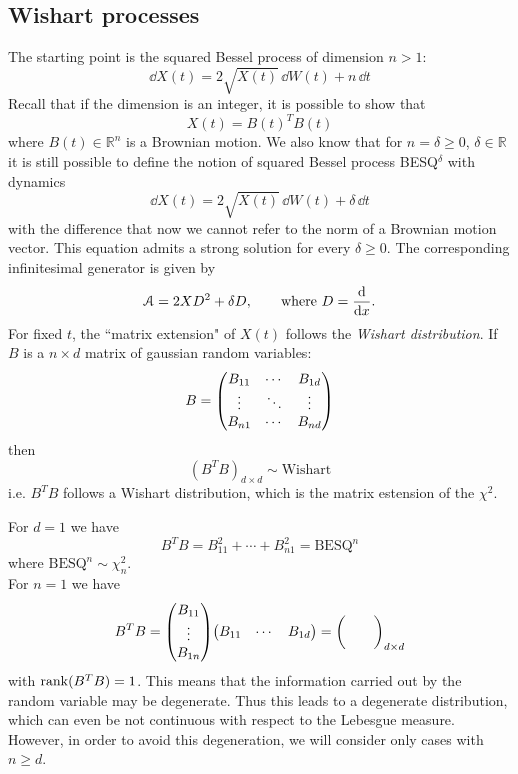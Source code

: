 \subsection{Wishart processes}
The starting point is the squared Bessel process of dimension $n>1$:
\begin{equation*}
    \dd X(t) = 2\sqrt{X(t)}\,\dd W(t) + n\,\dd t
\end{equation*}
Recall that if the dimension is an integer, it is possible to show that
\begin{equation*}
    X(t) = B(t)^TB(t)
\end{equation*}
where $B(t)\in\mathbb{R}^n$ is a Brownian motion. We also know that for $n = \delta \ge 0$, $\delta\in\mathbb{R}$ it is still possible to define the notion of squared Bessel process BESQ$^\delta$ with dynamics
\begin{equation*}
    \dd X(t) = 2\sqrt{X(t)}\,\dd W(t) + \delta\,\dd t
\end{equation*}
with the difference that now we cannot refer to the norm of a Brownian motion vector. This equation admits a strong solution for every $\delta\ge0$. The corresponding infinitesimal generator is given by
\begin{equation*}
    \mathcal{A} = 2XD^2 + \delta D, \qquad \text{where } D = \dv{}{x}.
\end{equation*}
For fixed $t$, the ``matrix extension" of $X(t)$ follows the \emph{Wishart distribution}. If $B$ is a $n\times d$ matrix of gaussian random variables:
\begin{equation}
    B = \mqty(B_{11} & \cdots & B_{1d} \\
              \vdots & \ddots & \vdots \\
              B_{n1} & \cdots & B_{nd})
\end{equation}
then
\begin{equation}
    (B^TB)_{d\times d} \sim \text{Wishart}
\end{equation}
i.e. $B^TB$ follows a Wishart distribution, which is the matrix estension of the $\chi^2$. \\
\begin{example}{}{}{}
    For $d=1$ we have
    \begin{equation*}
        B^TB = B_{11}^2 + \cdots + B^2_{n1} = \text{BESQ}^n
    \end{equation*}
    where $\text{BESQ}^n \sim \chi^2_n$. \\
    For $n=1$ we have
    \begin{equation*}
        B^TB = \mqty(B_{11} \\ \vdots \\ B_{1n})\mqty(B_{11} & \cdots & B_{1d}) = \mqty( & & \\ & & )_{d\times d}
    \end{equation*}
    with $\rank(B^TB) = 1$. This means that the information carried out by the random variable may be degenerate. Thus this leads to a degenerate distribution, which can even be not continuous with respect to the Lebesgue measure. However, in order to avoid this degeneration, we will consider only cases with $n\ge d$.
\end{example} %
